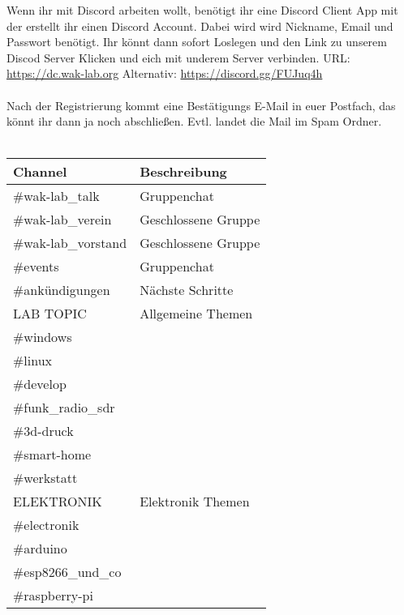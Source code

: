 Wenn ihr mit Discord arbeiten wollt, benötigt ihr eine Discord Client App mit der erstellt ihr einen Discord Account. Dabei wird wird Nickname, Email und Passwort benötigt. Ihr könnt dann sofort Loslegen und den Link zu unserem Discod Server Klicken und eich mit underem Server verbinden. URL: \url{https://dc.wak-lab.org} Alternativ: \url{https://discord.gg/FUJuq4h}\\
\ \\
Nach der Registrierung kommt eine Bestätigungs E-Mail in euer Postfach, das könnt ihr dann ja noch abschließen. Evtl. landet die Mail im Spam Ordner. \\

\ \\
\begin{raggedright}
\begin{tabular}{|p{}|p{}|}
\hline
\textbf{Channel} & \textbf{Beschreibung}\\
\hline
\#wak-lab\_talk & Gruppenchat\\
\hline
\#wak-lab\_verein & Geschlossene Gruppe\\
\hline
\#wak-lab\_vorstand & Geschlossene Gruppe\\
\hline
\#events & Gruppenchat\\
\hline
\#ankündigungen & Nächste Schritte\\
\hline
LAB TOPIC & Allgemeine Themen\\
\cline{1-1}
\#windows & \\
\cline{1-1}
\#linux & \\
\cline{1-1}
\#develop & \\
\cline{1-1}
\#funk\_radio\_sdr & \\
\cline{1-1}
\#3d-druck & \\
\cline{1-1}
\#smart-home & \\
\cline{1-1}
\#werkstatt & \\
\hline
ELEKTRONIK & Elektronik Themen\\
\cline{1-1}
\#electronik & \\
\cline{1-1}
\#arduino & \\
\cline{1-1}
\#esp8266\_und\_co & \\
\cline{1-1}
\#raspberry-pi & \\
\hline
\end{tabular}
\label{tab:Channels}
\end{raggedright}



